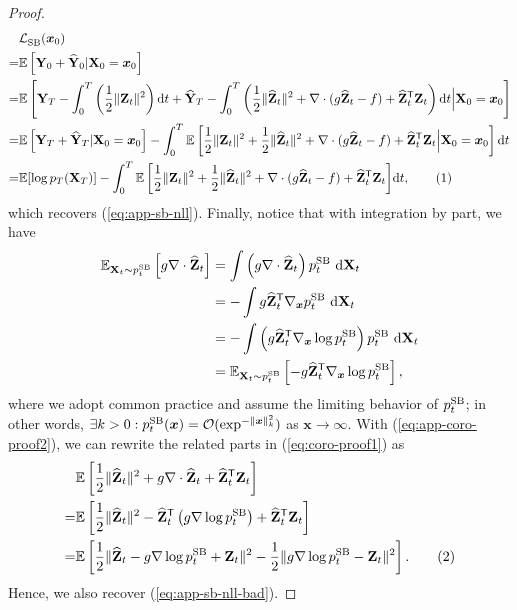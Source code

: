 \documentclass{article}
\def\eqref#1{(\ref{#1})}
\def\rd{{\textnormal{d}}}
\def\rvX{{\mathbf{X}}}
\def\rvY{{\mathbf{Y}}}
\def\rvZ{{\mathbf{Z}}}
\def\vx{{\bm{x}}}
\newcommand{\E}{\mathbb{E}}
\newcommand{\norm}[1]{\lVert#1\rVert}
\def\dt{{ \mathrm{d} t }}
\def\calO{{\cal O}}
\newcommand{\br}[1]{\left[#1\right]}
\newcommand{\pr}[1]{\left(#1\right)}
\newcommand{\T}{\mathsf{T}}
\newcommand\numberthis{\addtocounter{equation}{1}\tag{\theequation}}
\begin{document}
\begin{proof}
    \begin{align*}
        &\LSB(\vx_0) \\
        =& \E \br{\rvY_0 + \widehat{\rvY}_0 | \rvX_0=\vx_0} \\
        =& \E\br{{\rvY}_T - \int_0^T \pr{\frac{1}{2} \norm{\rvZ_t}^2}\dt +
         \widehat{\rvY}_T - \int_0^T \pr{\frac{1}{2} \norm{\widehat{\rvZ}_t}^2 + \nabla \cdot (g\widehat{\rvZ}_t -f) + \widehat{\rvZ}_t^\T\rvZ_t } \dt \Big| \rvX_0=\vx_0} \\
        =& \E \br{\rvY_T + \widehat{\rvY}_T | \rvX_0=\vx_0}
         - \int_0^T \E\br{ \frac{1}{2} \norm{\rvZ_t}^2 + \frac{1}{2} \norm{\widehat{\rvZ}_t}^2 + \nabla \cdot (g\widehat{\rvZ}_t -f) + \widehat{\rvZ}_t^\T\rvZ_t \Big| \rvX_0=\vx_0} \dt  \\
        =& \E [\log p_T(\rvX_T)]
         - \int_0^T {\E\br{ \frac{1}{2} \norm{\rvZ_t}^2 + \frac{1}{2} \norm{\widehat{\rvZ}_t}^2 + \nabla \cdot (g\widehat{\rvZ}_t -f) + \widehat{\rvZ}_t^\T\rvZ_t}} \dt, \numberthis \label{eq:coro-proof1}
    \end{align*}
    which recovers \eqref{eq:app-sb-nll}. Finally, notice that with integration by part, we have
    \begin{equation}
    \begin{split}
        \E_{\rvX_t\sim\pp{t}{SB}}\br{g \nabla \cdot \widehat{\rvZ}_t}
          &= \int \pr{  g \nabla \cdot \widehat{\rvZ}_t} \pp{t}{SB}~\rd\rvX_t \\
          &=-\int g \widehat{\rvZ}_t^\T \nabla_\vx \pp{t}{SB}~\rd\rvX_t \\
          &=-\int \pr{  g \widehat{\rvZ}_t^\T\nabla_\vx \log\pp{t}{SB}} \pp{t}{SB}~\rd\rvX_t \\
          &=\E_{\rvX_t\sim\pp{t}{SB}}\br{- g \widehat{\rvZ}_t^\T\nabla_\vx \log\pp{t}{SB}},
        \label{eq:app-coro-proof2}
    \end{split}
    \end{equation}
    where we adopt common practice and assume the limiting behavior of $p_{t}^{\text{\normalfont{SB}}}$; in other words,
    $\exists k>0: \pp{t}{SB}(\vx) = \calO(\exp^{-\norm{\vx}_k^2})$ as $\vx \rightarrow \infty$.
    With \eqref{eq:app-coro-proof2}, we can rewrite the related parts in \eqref{eq:coro-proof1} as
    \begin{align*}
        &\E\br{ \frac{1}{2} \norm{\widehat{\rvZ}_t}^2 + g \nabla \cdot \widehat{\rvZ}_t + \widehat{\rvZ}_t^\T\rvZ_t} \\
        =& \E\br{ \frac{1}{2} \norm{\widehat{\rvZ}_t}^2 - \widehat{\rvZ}_t^\T\pr{g\nabla \log \pp{t}{SB}} + \widehat{\rvZ}_t^\T\rvZ_t} \\
        =& \E\br{ \frac{1}{2} \norm{\widehat{\rvZ}_t - g\nabla \log \pp{t}{SB} + \rvZ_t}^2 - \frac{1}{2} \norm{g\nabla \log \pp{t}{SB} - \rvZ_t}^2 }. \numberthis
        \label{eq:app-coro-proof3}
    \end{align*}
    Hence, we also recover \eqref{eq:app-sb-nll-bad}.
\end{proof}
\end{document}
